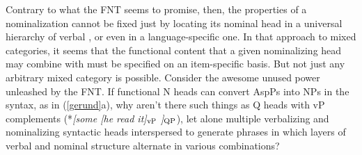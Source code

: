 \documentclass[output=paper,
modfonts
]{LSP/langsci}
\newcommand{\rfa}[2]{(\ref{#1}{#2})}
\def\trf#1{$_{\textrm{\scriptsize{#1}}}$}
\begin{document}
%
%
%


Contrary to what the FNT seems to promise, then, the  properties of a
nominalization cannot be fixed just by locating its nominal head in a universal hierarchy of
verbal , or even in a language-specific one.  In that approach to mixed
categories, it seems that the functional content that a given nominalizing head may combine
with must be specified on an item-specific basis.  But not just any arbitrary mixed category is
possible.  Consider the awesome unused power unleashed by the FNT.  If functional N heads can
convert AspPs into NPs in the syntax, as in \rfa{gerund}{a}, why aren't there such things as Q
heads with vP complements (*\textit{[some [he read it]\trf{vP} ]\trf{QP}}), let alone
multiple verbalizing and nominalizing syntactic heads interspersed to generate phrases in which
layers of verbal and nominal structure alternate in various combinations?
\end{document}
